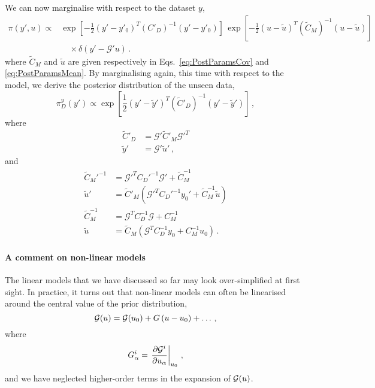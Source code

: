 We can now marginalise with respect to the dataset $y$, 
\begin{equation}
  \label{eq:MarginaliseDatasetY}
  \begin{split}
    \pi(y',u) 
    \propto &
    \exp\left[-\frac12 \left(y'-y'_0\right)^T (C'_D)^{-1} 
    \left(y'-y'_0\right)\right]\, 
    \exp\left[-\frac12 \left(u-\tilde{u}\right)^T (\tilde{C}_M)^{-1} 
    \left(u-\tilde{u}\right)\right] \\
    & \quad \times \delta\left(y'- \mathcal{G}'u\right)\, .
  \end{split}
\end{equation}
where $\tilde{C}_M$ and $\tilde{u}$ are given respectively in
Eqs.~\ref{eq:PostParamsCov} and \ref{eq:PostParamsMean}. By marginalising again,
this time with respect to the model, we derive the posterior distribution of the
unseen data,
\begin{equation}
  \label{eq:MarginaliseModelU}
  \pi^y_D(y') \propto 
  \exp \left[ 
   \frac12 \left(y' - \tilde{y}'\right)^T
   (\tilde{C}'_D)^{-1} 
   \left(y' - \tilde{y}'\right)
   \right]\, ,
\end{equation}
where
\begin{align}
  \tilde{C}'_D 
  &= \mathcal{G}' \tilde{C}'_M \mathcal{G}'^{T} \\
  \tilde{y}'
  &= \mathcal{G}' \tilde{u}'\, ,
\end{align}
and 
\begin{align}
  \label{eq:ModelPostSequential}
  \tilde{C}_M'^{-1} 
  &= \mathcal{G}'^T C_D'^{-1} \mathcal{G}' + \tilde{C}_M^{-1} \\
  \tilde{u}' 
  &= \tilde{C}'_M \left(
    \mathcal{G}'^T C_D'^{-1} y_0' + \tilde{C}_M^{-1} \tilde{u} 
    \right) \\
  \tilde{C}_M^{-1}
  &= \mathcal{G}^T C_D^{-1} \mathcal{G} + C_M^{-1} \\
  \tilde{u}
  &= \tilde{C}_M \left(
    \mathcal{G}^T C_D^{-1} y_0 + C_M^{-1} u_0
  \right)\, .
\end{align}

\paragraph{A comment on non-linear models}

The linear models that we have discussed so far may look over-simplified at
first sight. In practice, it turns out that non-linear models can often be
linearised around the central value of the prior distribution, 
\begin{equation}
  \label{eq:LinU0}
  \mathcal{G}(u) = \mathcal{G}(u_0) + G \left(u - u_0\right) + \ldots\, ,
\end{equation}
where 
\begin{equation}
  \label{eq:FirstDerU0}
  G^i_\alpha = \left. \frac{\partial \mathcal{G}^i}{\partial u_\alpha} \right|_{u_0}\, ,
\end{equation}
and we have neglected higher-order terms in the expansion of
$\mathcal{G}(u)$.

